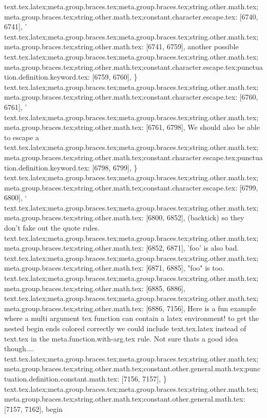 {{{{{{{{{{{{{{{{{{{{{{{{{{{{{{{{{{{{{{{{{{{{{{{{{{{{{{{{{{{{{{{{{{{{{{{{{{{{{{{{{{{{{{{{{{{{{{{{{{{{{{{{{{{{{{{{{{{{{{{{{{{{{{{{{{{{{{{{{{{{{{{{{{{{{{{{{{{{{{{{{{{{{{{{{{{{{{{{{{{{{{{{text.tex.latex;meta.group.braces.tex;meta.group.braces.tex;string.other.math.tex;meta.group.braces.tex;string.other.math.tex;constant.character.escape.tex: [6740, 6741], {'}
text.tex.latex;meta.group.braces.tex;meta.group.braces.tex;string.other.math.tex;meta.group.braces.tex;string.other.math.tex: [6741, 6759], { another possible }
text.tex.latex;meta.group.braces.tex;meta.group.braces.tex;string.other.math.tex;meta.group.braces.tex;string.other.math.tex;constant.character.escape.tex;punctuation.definition.keyword.tex: [6759, 6760], {\}
text.tex.latex;meta.group.braces.tex;meta.group.braces.tex;string.other.math.tex;meta.group.braces.tex;string.other.math.tex;constant.character.escape.tex: [6760, 6761], {'}
text.tex.latex;meta.group.braces.tex;meta.group.braces.tex;string.other.math.tex;meta.group.braces.tex;string.other.math.tex: [6761, 6798], {  We should also be able to escape a }
text.tex.latex;meta.group.braces.tex;meta.group.braces.tex;string.other.math.tex;meta.group.braces.tex;string.other.math.tex;constant.character.escape.tex;punctuation.definition.keyword.tex: [6798, 6799], {\}
text.tex.latex;meta.group.braces.tex;meta.group.braces.tex;string.other.math.tex;meta.group.braces.tex;string.other.math.tex;constant.character.escape.tex: [6799, 6800], {`}
text.tex.latex;meta.group.braces.tex;meta.group.braces.tex;string.other.math.tex;meta.group.braces.tex;string.other.math.tex: [6800, 6852], { (backtick) so they don't fake out the quote rules.
}
text.tex.latex;meta.group.braces.tex;meta.group.braces.tex;string.other.math.tex;meta.group.braces.tex;string.other.math.tex: [6852, 6871], {'foo' is also bad.
}
text.tex.latex;meta.group.braces.tex;meta.group.braces.tex;string.other.math.tex;meta.group.braces.tex;string.other.math.tex: [6871, 6885], {"foo" is too.
}
text.tex.latex;meta.group.braces.tex;meta.group.braces.tex;string.other.math.tex;meta.group.braces.tex;string.other.math.tex: [6885, 6886], {
}
text.tex.latex;meta.group.braces.tex;meta.group.braces.tex;string.other.math.tex;meta.group.braces.tex;string.other.math.tex: [6886, 7156], {Here is a fun example where a multi argument tex function can contain a latex environment!  to get the nested begin ends colored correctly we could include text.tex.latex instead of text.tex in the meta.function.with-arg.tex rule.  Not sure thats a good idea though....
}
text.tex.latex;meta.group.braces.tex;meta.group.braces.tex;string.other.math.tex;meta.group.braces.tex;string.other.math.tex;constant.other.general.math.tex;punctuation.definition.constant.math.tex: [7156, 7157], {\}
text.tex.latex;meta.group.braces.tex;meta.group.braces.tex;string.other.math.tex;meta.group.braces.tex;string.other.math.tex;constant.other.general.math.tex: [7157, 7162], {begin}
}}}}}}}}}}}}}}}}}}}}}}}}}}}}}}}}}}}}}}}}}}}}}}}}}}}}}}}}}}}}}}}}}}}}}}}}}}}}}}}}}}}}}}}}}}}}}}}}}}}}}}}}}}}}}}}}}}}}}}}}}}}}}}}}}}}}}}}}}}}}}}}}}}}}}}}}}}}}}}}}}}}}}}}}}}}}}}}}}}}}}}}}}}}

